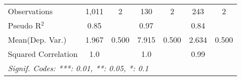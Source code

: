 \begin{tabular}{lcccccc}
   Observations                                               & 1,011         & 2    & 130            & 2    & 243           & 2\\  
   Pseudo R$^2$                                               & 0.85          &      & 0.97           &      & 0.84          & \\  
Mean(Dep. Var.) & 1.967 & 0.500 & 7.915 & 0.500 & 2.634 & 0.500 \\
   Squared Correlation                                        & 1.0           &      & 1.0            &      & 0.99          & \\  
   \midrule \midrule
   \multicolumn{7}{l}{\emph{Signif. Codes: ***: 0.01, **: 0.05, *: 0.1}}\\
\end{tabular}
\par\endgroup
